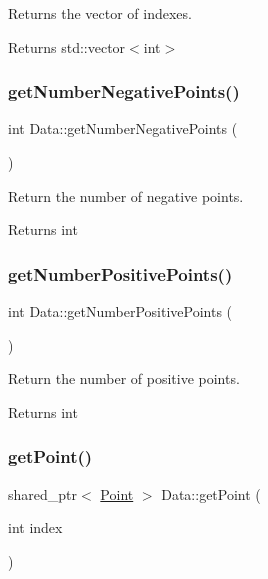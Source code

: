 Returns the vector of indexes. 

\begin{DoxyReturn}{Returns}
std\+::vector$<$int$>$ 
\end{DoxyReturn}
\mbox{\label{class_data_a5166e74e946c2dbac75f383d63f018ea}} 
\subsubsection{\texorpdfstring{get\+Number\+Negative\+Points()}{getNumberNegativePoints()}}
{\footnotesize\ttfamily int Data\+::get\+Number\+Negative\+Points (\begin{DoxyParamCaption}{ }\end{DoxyParamCaption})}



Return the number of negative points. 

\begin{DoxyReturn}{Returns}
int 
\end{DoxyReturn}
\mbox{\label{class_data_a45a39ab2144bcdd0ac1aa67d7d08a6cc}} 
\subsubsection{\texorpdfstring{get\+Number\+Positive\+Points()}{getNumberPositivePoints()}}
{\footnotesize\ttfamily int Data\+::get\+Number\+Positive\+Points (\begin{DoxyParamCaption}{ }\end{DoxyParamCaption})}



Return the number of positive points. 

\begin{DoxyReturn}{Returns}
int 
\end{DoxyReturn}
\mbox{\label{class_data_abd978f3708d705e972dc458b6e3fe791}} 
\subsubsection{\texorpdfstring{get\+Point()}{getPoint()}}
{\footnotesize\ttfamily shared\+\_\+ptr$<$ \hyperlink{class_point}{Point} $>$ Data\+::get\+Point (\begin{DoxyParamCaption}\item[{int}]{index }\end{DoxyParamCaption})}



